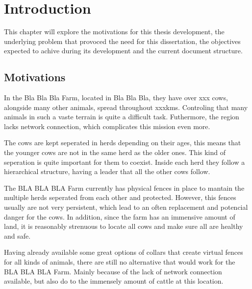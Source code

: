 
%

\chapter{Introduction}
\label{cha:introduction}
\hspace{5mm} This chapter will explore the motivations for this thesis development, the
underlying problem that provoced the need for this dissertation, the objectives
expected to achive during its development and the current document structure.

\section{Motivations}
\label{sec:motivations}
\hspace{5mm} In the Bla Bla Bla Farm, located in Bla Bla Bla, they have over xxx cows,
alongside many other animals, spread throughout xxxkms. Controling that many animals
in such a vaste terrain is quite a difficult task. Futhermore, the region lacks
network connection, which complicates this mission even more.

The cows are kept seperated in herds depending on their ages, this means that the
younger cows are not in the same herd as the older ones. This kind of seperation
is quite important for them to coexist. Inside each herd they follow a hierarchical
structure, having a leader that all the other cows follow.

The BLA BLA BLA Farm currently has physical fences in place to mantain the multiple
herds seperated from each other and protected. However, this fences usually are
not very persistent, which lead to an often replacement and potencial danger for
the cows. In addition, since the farm has an immensive amount of land, it is
reasonably strenuous to locate all cows and make sure all are healthy and safe.

Having already available some great options of collars that create virtual fences
for all kinds of animals, there are still no alternative that would work for
the BLA BLA BLA Farm. Mainly because of the lack of network connection
available, but also do to the immensely amount of cattle at this location.


